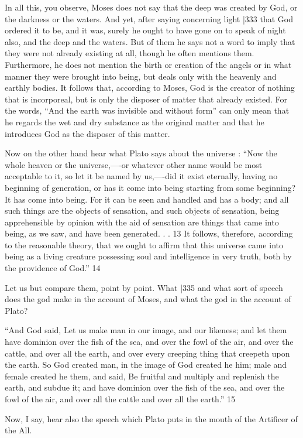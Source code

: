 In all this, you observe, Moses does not say that the deep was created by God, or the darkness or the waters. And yet, after saying concerning light
|333 that God ordered it to be, and it was, surely he ought to have gone on to speak of night also, and the deep and the waters. But of them he says not a word to imply that they were not already existing at all, though he often mentions them. Furthermore, he does not mention the birth or creation of the angels or in what manner they were brought into being, but deals only with the heavenly and earthly bodies. It follows that, according to Moses, God is the creator of nothing that is incorporeal, but is only the disposer of matter that already existed. For the words, ``And the earth was invisible and without form'' can only mean that he regards the wet and dry substance as the original matter and that he introduces God as the disposer of this matter.

Now on the other hand hear what Plato says about the universe : ``Now the whole heaven or the universe,----or whatever other name would be most acceptable to it, so let it be named by us,----did it exist eternally, having no beginning of generation, or has it come into being starting from some beginning? It has come into being. For it can be seen and handled and has a body; and all such things are the objects of sensation, and such objects of sensation, being apprehensible by opinion with the aid of sensation are things that came into being, as we saw, and have been generated. . .
13 It follows, therefore, according to the reasonable theory, that we ought to affirm that this universe came into being as a living creature possessing soul and intelligence in very truth, both by the providence of God.''
14

Let us but compare them, point by point. What |335
and what sort of speech does the god make in the account of Moses, and what the god in the account of Plato?

``And God said, Let us make man in our image, and our likeness; and let them have dominion over the fish of the sea, and over the fowl of the air, and over the cattle, and over all the earth, and over every creeping thing that creepeth upon the earth. So God created man, in the image of God created he him; male and female created he them, and said, Be fruitful and multiply and replenish the earth, and subdue it; and have dominion over the fish of the sea, and over the fowl of the air, and over all the cattle and over all the earth.''
15

Now, I say, hear also the speech which Plato puts in the mouth of the Artificer of the All.

